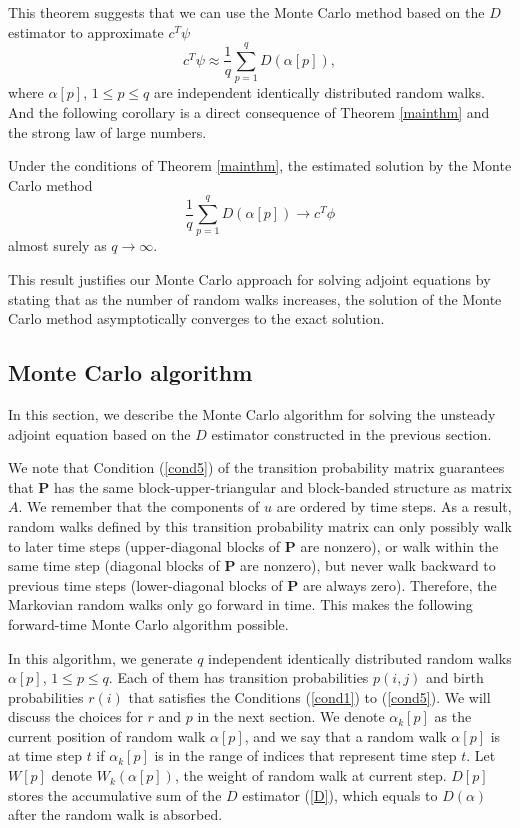         This theorem suggests that we can use the Monte Carlo method based
        on the $D$ estimator to approximate $c^T \psi$
        \[ c^T \psi \approx \frac1q \sum_{p=1}^q D(\alpha[p]), \]
        where $\alpha[p]$, $1\le p \le q$ are independent identically
        distributed random walks.  And the following corollary is a direct
        consequence of Theorem \ref{mainthm} and the strong law of large
        numbers.
        \begin{corollary}
            Under the conditions of Theorem \ref{mainthm}, the estimated
            solution by the Monte Carlo method
            \[ \frac1q \sum_{p=1}^q D(\alpha[p]) \to c^T \phi \]
            almost surely as $q\to\infty$.
        \end{corollary}
        This result justifies our Monte Carlo approach for solving adjoint
        equations by stating that as the number of random walks increases,
        the solution of the Monte Carlo method asymptotically converges to
        the exact solution.


    
    \subsection{Monte Carlo algorithm}
        In this section, we describe the Monte Carlo algorithm for solving the
        unsteady adjoint equation based on the $D$ estimator constructed in
        the previous section.
        
        We note that Condition (\ref{cond5}) of the transition probability
        matrix guarantees that $\mathbf{P}$ has the same block-upper-triangular
        and block-banded structure as matrix $A$. We remember that the
        components of $u$ are ordered by time steps. As a result, random
        walks defined by this transition probability matrix can only possibly
        walk to later time steps (upper-diagonal blocks of $\mathbf{P}$ are
        nonzero), or walk within the same time step (diagonal blocks of
        $\mathbf{P}$ are nonzero), but never walk backward to previous
        time steps (lower-diagonal blocks of $\mathbf{P}$ are always zero).
        Therefore, the Markovian random walks only go forward in time.
        This makes the following forward-time Monte Carlo algorithm possible.
        
        In this algorithm, we generate $q$ independent identically
        distributed random walks $\alpha[p]$, $1\le p\le q$. Each of them
        has transition probabilities $p(i,j)$ and birth probabilities $r(i)$
        that satisfies the Conditions (\ref{cond1}) to (\ref{cond5}). We will
        discuss the choices for $r$ and $p$ in the next section. We denote
        $\alpha_k[p]$ as the current position of random walk $\alpha[p]$,
        and we say that a random walk $\alpha[p]$ is at time step $t$ if
        $\alpha_k[p]$ is in the range of indices that represent time step
        $t$. Let $W[p]$ denote $W_k(\alpha[p])$, the weight of random walk
        at current step. $D[p]$ stores the accumulative sum of the $D$
        estimator (\ref{D}), which equals to $D(\alpha)$ after the random
        walk is absorbed.
        
